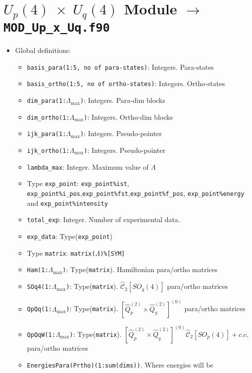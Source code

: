 \documentclass[english,twoside, openright]{report}
\newcommand{\cas}[2]{
  \hat{\mathcal{C}}_{#1}\left[#2\right]
}
\begin{document}
\section{$U_p(4)\;\times\;U_q(4)$ Module $\rightarrow$ \texttt{MOD\_Up\_x\_Uq.f90}}

\begin{itemize}
\item Global definitions:
  \begin{itemize}
  \item \texttt{basis\_para(1:5, no of para-states)}: Integers. Para-states
  \item \texttt{basis\_ortho(1:5, no of ortho-states)}: Integers. Ortho-states
  \item \texttt{dim\_para(1:$\Lambda_{\text{max}}$)}: Integers. Para-dim blocks
  \item \texttt{dim\_ortho(1:$\Lambda_{\text{max}}$)}: Integers. Ortho-dim blocks
  \item \texttt{ijk\_para(1:$\Lambda_{\text{max}}$)}: Integers. Pseudo-pointer
  \item \texttt{ijk\_ortho(1:$\Lambda_{\text{max}}$)}: Integers. Pseudo-pointer
  \item \texttt{lambda\_max}: Integer. Maximum value of $\Lambda$
  \item Type \texttt{exp\_point}: \texttt{exp\_point\%ist}, \texttt{exp\_point\%i\_pos},\texttt{exp\_point\%fst},\texttt{exp\_point\%f\_pos}, \texttt{exp\_point\%energy} and \texttt{exp\_point\%intensity}
  \item \texttt{total\_exp}: Integer. Number of experimental data.
  \item \texttt{exp\_data}: Type(\texttt{exp\_point})
  \item Type \texttt{matrix}: \texttt{matrix($\Lambda$)\%[SYM]}
  \item \texttt{Ham(1:$\Lambda_{\text{max}}$)}: Type(\texttt{matrix}). Hamiltonian para/ortho matrices
  \item \texttt{SOq4(1:$\Lambda_{\text{max}}$)}: Type(\texttt{matrix}). $\cas{2}{SO_q(4)}$ para/ortho matrices
  \item \texttt{QpQq(1:$\Lambda_{\text{max}}$)}: Type(\texttt{matrix}). $\left[\hat{Q}_p^{(2)}\times\hat{Q}_q^{(2)}\right]^{(0)}$ para/ortho matrices
  \item \texttt{QpQqW(1:$\Lambda_{\text{max}}$)}: Type(\texttt{matrix}). $\left[\hat{Q}_p^{(2)}\times\hat{Q}_q^{(2)}\right]^{(0)} \cas{2}{SO_p(4)} + c.c.$ para/ortho matrices
  \item \texttt{EnergiesPara(Prtho)(1:sum(dims))}. Where energies will be

\end{itemize}
\end{itemize}
\end{document}
